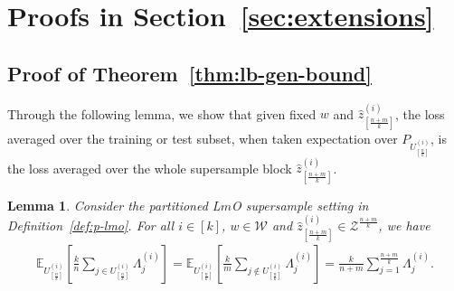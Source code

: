\documentclass[onecolumn,romanappendices,10pt]{IEEEtran}
\newtheorem{lemma}{Lemma}
\newcommand{\Wcal}{{\mathcal W}}
\newcommand{\Zcal}{{\mathcal Z}}
\newcommand{\EE}{{\mathbb{E}}}
\begin{document}
	\section{Proofs in Section~\ref{sec:extensions}} \label{app:proof-extensions}
	\setcounter{subsection}{0}	
	\subsection{Proof of Theorem~\ref{thm:lb-gen-bound}} \label{subapp:lb-gen-bound}
	Through the following lemma, we show that given fixed $w$ and $\hat{z}^{(i)}_{[\frac{n+m}{k}]}$, the loss averaged over the training or test subset, when taken expectation over $P_{U^{(i)}_{[\frac{n}{k}]}}$, is the loss averaged over the whole supersample block $\hat{z}^{(i)}_{[\frac{n+m}{k}]}$.
	\begin{lemma}\label{lem:average-emp-loss}
		Consider the partitioned L$m$O supersample setting in Definition~\ref{def:p-lmo}. For all $i \in [k]$, $w \in \Wcal$ and $\hat{z}^{(i)}_{[\frac{n+m}{k}]} \in \Zcal^{\frac{n+m}{k}}$, we have
		\begin{equation}
			\begin{aligned}
				\EE_{U^{(i)}_{[\frac{n}{k}]}} \left[ \frac{k}{n} \sum_{j \in U^{(i)}_{[\frac{n}{k}]}} \Lambda^{(i)}_j \right] = \EE_{U^{(i)}_{[\frac{n}{k}]}} \left[ \frac{k}{m} \sum_{j \not\in U^{(i)}_{[\frac{n}{k}]}} \Lambda^{(i)}_j \right] = \frac{k}{n+m} \sum_{j=1}^{\frac{n+m}{k}} \Lambda^{(i)}_j.
			\end{aligned}
		\end{equation}
	\end{lemma}
\end{document}

